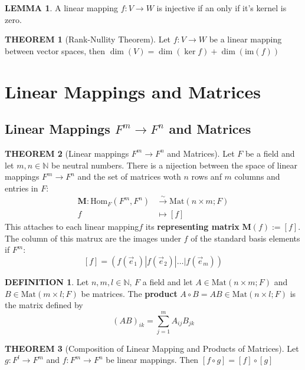 \documentclass[12pt]{article}
\theoremstyle{definition}
\newtheorem{definition}{DEFINITION}[subsection]
\newtheorem{theorem}{THEOREM}[subsection]
\newcommand{\Hom}{\text{Hom}}
\newcommand{\image}{\text{im}}
\newcommand{\Mat}{\text{Mat}}
\newtheorem{lemma}{LEMMA}[subsection]
\begin{document}
\begin{lemma}
    A linear mapping $f: V \rightarrow W$ is injective if an only if it's kernel is zero.
\end{lemma}

\begin{theorem}[Rank-Nullity Theorem]
    Let $f: V \rightarrow W$ be a linear mapping between vector spaces, then $\dim(V) = \dim(\ker{f}) + \dim(\image(f))$
\end{theorem}

\section{Linear Mappings and Matrices}
\subsection{Linear Mappings $F^m \rightarrow F^n$ and Matrices}
\begin{theorem}[Linear mappings $F^m \rightarrow F^n$ and Matrices]
    Let $F$ be a field and let $m,n \in \mathbb{N}$ be neutral numbers. There is a nijection between the space of linear mappings $F^m \rightarrow F^n$ and the set of matrices woth $n$ rows anf $m$ columns and entries in $F$:
    \[\begin{split}
        \textbf{M}: \Hom_F(F^m,F^n) &\stackrel{\sim}{\rightarrow} \Mat(n \times m; F)\\
        f &\mapsto [f]
    \end{split}\]
    This attaches to each linear mapping$f$ its \textbf{representing matrix} $\textbf{M}(f):=[f]$. The column of this matrux are the images under $f$ of the standard basis elements if $F^m$:
    $$[f] = (f(\overrightarrow{e}_1)|f(\overrightarrow{e}_2)|\dots|f(\overrightarrow{e}_m))$$
\end{theorem}

\begin{definition}
    Let $n,m,l\in \mathbb{N}$, $F$ a field and let $A \in \Mat(n\times m; F)$ and $B \in \Mat(m\times l; F)$ be matrices. The \textbf{product} $A \circ B = AB \in \Mat(n\times l; F)$ is the matrix defined by $$(AB)_{ik} = \sum_{j=1}^m{A_{ij}B_{jk}}$$
\end{definition}

\begin{theorem}[Composition of Linear Mapping and Products of Matrices]
    Let $g:F^l \rightarrow F^m$ and $f:F^m \rightarrow F^n$ be linear mappings. Then $[f \circ g] = [f] \circ [g]$
\end{theorem}
\end{document}
